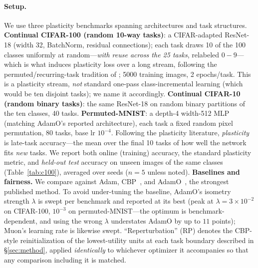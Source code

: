 \documentclass[letterpaper]{article} %
\begin{document}
\paragraph{Setup.} We use three plasticity benchmarks spanning architectures and task structures. \textbf{Continual CIFAR-100 (random 10-way tasks)}: a CIFAR-adapted ResNet-18 (width 32, BatchNorm, residual connections); each task draws 10 of the 100 classes uniformly at random---\emph{with reuse across the 25 tasks}, relabeled $0\!-\!9$---which is what induces plasticity loss over a long stream, following the permuted/recurring-task tradition of \citet{dohare2024}; 5000 training images, 2 epochs/task. This is a plasticity stream, \emph{not} standard one-pass class-incremental learning (which would be ten disjoint tasks); we name it accordingly. \textbf{Continual CIFAR-10 (random binary tasks)}: the same ResNet-18 on random binary partitions of the ten classes, 40 tasks. \textbf{Permuted-MNIST}: a depth-4 width-512 MLP (matching AdamO's reported architecture), each task a fixed random pixel permutation, 80 tasks, base lr $10^{-4}$. Following the plasticity literature, \emph{plasticity} is late-task accuracy---the mean over the final 10 tasks of how well the network fits \emph{new} tasks. We report both online (training) accuracy, the standard plasticity metric, and \emph{held-out test} accuracy on unseen images of the same classes (Table~\ref{tab:c100}), averaged over seeds ($n{=}5$ unless noted). \textbf{Baselines and fairness.} We compare against Adam, CBP~\citep{dohare2024}, and AdamO~\citep{adamo2026}, the strongest published method. To avoid under-tuning the baseline, AdamO's isometry strength $\lambda$ is swept per benchmark and reported at its best (peak at $\lambda{=}3{\times}10^{-2}$ on CIFAR-100, $10^{-3}$ on permuted-MNIST---the optimum is benchmark-dependent, and using the wrong $\lambda$ understates AdamO by up to $11$ points); Muon's learning rate is likewise swept. ``Reperturbation'' (RP) denotes the CBP-style reinitialization of the lowest-utility units at each task boundary described in \S\ref{sec:method}, applied \emph{identically} to whichever optimizer it accompanies so that any comparison including it is matched.
\end{document}

